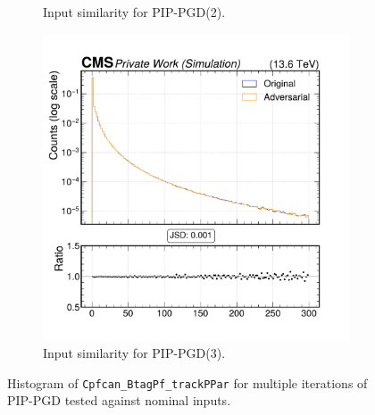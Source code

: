 \begin{figure}[h]
\begin{subfigure}[t]{0.32\textwidth}
    \caption*{Input similarity for PIP-PGD(2).}
  \end{subfigure}\hfill
  \begin{subfigure}[t]{0.32\textwidth}
    \includegraphics[width=\linewidth]{media/output/features/compare/combined_it_3/cmp_cpf_arr_Cpfcan_BtagPf_trackPPar.pdf}
    \caption*{Input similarity for PIP-PGD(3).}
  \end{subfigure}

  \caption*{Histogram of \texttt{Cpfcan\_BtagPf\_trackPPar} for multiple iterations of PIP-PGD tested against nominal inputs.}
  \label{fig:combined_input_Cpfcan_BtagPf_trackPPar}
\end{figure}

